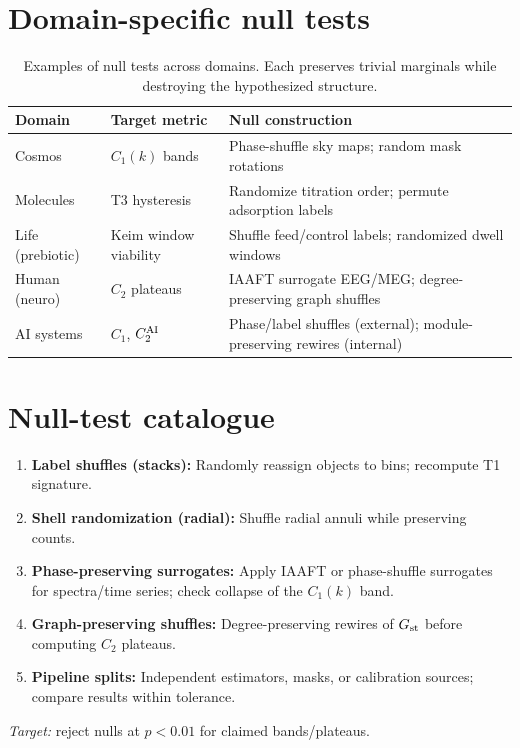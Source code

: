 \documentclass[12pt,a4paper,oneside]{scrreprt}
\begin{document}
\section*{Domain-specific null tests}
\begin{table}[htbp]\centering
\caption{Examples of null tests across domains. Each preserves trivial marginals
while destroying the hypothesized structure.}
\begin{tabular}{lll}\toprule
Domain & Target metric & Null construction \\ \midrule
Cosmos & $C_1(k)$ bands & Phase-shuffle sky maps; random mask rotations \\
Molecules & T3 hysteresis & Randomize titration order; permute adsorption labels \\
Life (prebiotic) & Keim window viability & Shuffle feed/control labels; randomized dwell windows \\
Human (neuro) & $C_2$ plateaus & IAAFT surrogate EEG/MEG; degree-preserving graph shuffles \\
AI systems & $C_1$, $C_2^{\rm AI}$ & Phase/label shuffles (external); module-preserving rewires (internal) \\
\bottomrule
\end{tabular}
\end{table}


\section*{Null-test catalogue}
\begin{enumerate}
\item \textbf{Label shuffles (stacks):} Randomly reassign objects to bins; recompute T1 signature.  
\item \textbf{Shell randomization (radial):} Shuffle radial annuli while preserving counts.  
\item \textbf{Phase-preserving surrogates:} Apply IAAFT or phase-shuffle surrogates for spectra/time series; check collapse of the $C_1(k)$ band.  
\item \textbf{Graph-preserving shuffles:} Degree-preserving rewires of $G_{\rm st}$ before computing $C_2$ plateaus.  
\item \textbf{Pipeline splits:} Independent estimators, masks, or calibration sources; compare results within tolerance.  
\end{enumerate}
\emph{Target:} reject nulls at $p<0.01$ for claimed bands/plateaus.
\end{document}
